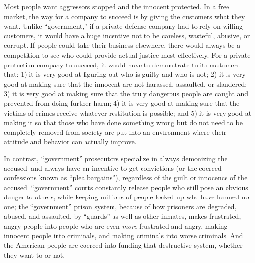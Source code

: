 \documentclass{book}
\begin{document}
Most people want aggressors stopped and the innocent protected. In a free market, the way for a company to succeed is by giving the customers what they want. Unlike \enquote{government,} if a private defense company had to rely on willing customers, it would have a huge incentive not to be careless, wasteful, abusive, or corrupt. If people could take their business elsewhere, there would always be a competition to see who could provide actual justice most effectively. For a private protection company to succeed, it would have to demonstrate to its customers that: 1) it is very good at figuring out who is guilty and who is not; 2) it is very good at making sure that the innocent are not harassed, assaulted, or slandered; 3) it is very good at making sure that the truly dangerous people are caught and prevented from doing further harm; 4) it is very good at making sure that the victims of crimes receive whatever restitution is possible; and 5) it is very good at making it so that those who have done something wrong but do not need to be completely removed from society are put into an environment where their attitude and behavior can actually improve.

In contrast, \enquote{government} prosecutors specialize in always demonizing the accused, and always have an incentive to get convictions (or the coerced confessions known as \enquote{plea bargains}), regardless of the guilt or innocence of the accused; \enquote{government} courts constantly release people who still pose an obvious danger to others, while keeping millions of people locked up who have harmed no one; the \enquote{government} prison system, because of how prisoners are degraded, abused, and assaulted, by \enquote{guards} as well as other inmates, makes frustrated, angry people into people who are even \emph{more} frustrated and angry, making innocent people into criminals, and making criminals into worse criminals. And the American people are coerced into funding that destructive system, whether they want to or not.
\end{document}
